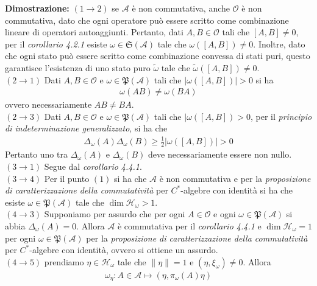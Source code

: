 \documentclass{article}
\numberwithin{equation}{subsection}
\begin{document}
\textbf{Dimostrazione:} $(1 \rightarrow 2)$ se $\mathscr{A}$ è non commutativa, anche $\mathscr{O}$ è non commutativa, dato che ogni operatore può essere scritto come combinazione lineare di operatori autoaggiunti. Pertanto, dati $A, B \in \mathscr{O}$ tali che $[A, B] \neq 0$, per il \textit{corollario 4.2.1} esiste $\omega \in \mathfrak{S}(\mathscr{A})$ tale che $\omega([A, B]) \neq 0$. Inoltre, dato che ogni stato può essere scritto come combinazione convessa di stati puri, questo garantisce l'esistenza di uno stato puro $\widetilde{\omega}$ tale che $\widetilde{\omega}([A, B]) \neq 0$. \\
$(2 \rightarrow 1)$ Dati $A, B \in \mathscr{O}$ e $\omega \in \mathfrak{P}(\mathscr{A})$ tali che $|\omega([A, B])| > 0$ si ha
\begin{align*}
    \omega(AB) \neq \omega(BA)
\end{align*}
ovvero necessariamente $AB \neq BA$. \\
$(2 \rightarrow 3)$ Dati $A, B \in \mathscr{O}$ e $\omega \in \mathfrak{P}(\mathscr{A})$ tali che $|\omega([A, B]) > 0$, per il \textit{principio di indeterminazione generalizzato}, si ha che
\begin{align*}
    \Delta_\omega(A)\Delta_\omega(B) \geq \frac{1}{2}|\omega([A, B])| > 0
\end{align*}
Pertanto uno tra $\Delta_\omega(A)$ e $\Delta_\omega(B)$ deve necessariamente essere non nullo. \\
$(3 \rightarrow 1)$ Segue dal \textit{corollario 4.4.1}. \\
$(3 \rightarrow 4)$ Per il punto $(1)$ si ha che $\mathscr{A}$ è non commutativa e per la \textit{proposizione di caratterizzazione della commutatività} per $C^*$-algebre con identità si ha che esiste $\omega \in \mathfrak{P}(\mathscr{A})$ tale che $\dim \mathcal{H}_\omega > 1$. \\
$(4 \rightarrow 3)$ Supponiamo per assurdo che per ogni $A \in \mathscr{O}$ e ogni $\omega \in \mathfrak{P}(\mathscr{A})$ si abbia $\Delta_\omega(A) = 0$. Allora $\mathscr{A}$ è commutativa per il \textit{corollario 4.4.1} e $\dim \mathcal{H}_\omega = 1$ per ogni $\omega \in \mathfrak{P}(\mathscr{A})$ per la \textit{proposizione di caratterizzazione della commutatività} per $C^*$-algebre con identità, ovvero si ottiene un assurdo. \\
$(4 \rightarrow 5)$ prendiamo $\eta \in \mathcal{H}_\omega$ tale che $\|\eta\| = 1$ e $(\eta, \xi_\omega) \neq 0$. Allora
\begin{align*}
    \omega_\eta : A \in \mathscr{A} \mapsto (\eta, \pi_\omega(A)\eta)
\end{align*}
\end{document}
